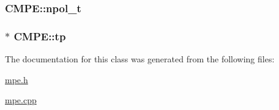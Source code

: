 \hypertarget{classCMPE_a4e0a6b27c4cd14dd576fe94854c8d58d}{
\subsubsection[{npol\-\_\-t}]{ C\-M\-P\-E\-::npol\-\_\-t\hspace{0.3cm}{\ttfamily [static]}}}\label{classCMPE_a4e0a6b27c4cd14dd576fe94854c8d58d}
\hypertarget{classCMPE_a0e97f318480ca27d2a7d608379bd2d03}{
\subsubsection[{tp}]{ $\ast$ C\-M\-P\-E\-::tp\hspace{0.3cm}{\ttfamily [static]}}}\label{classCMPE_a0e97f318480ca27d2a7d608379bd2d03}


The documentation for this class was generated from the following files\-:\begin{DoxyCompactItemize}
\item 
\hyperlink{mpe_8h}{mpe.\-h}\item 
\hyperlink{mpe_8cpp}{mpe.\-cpp}\end{DoxyCompactItemize}
